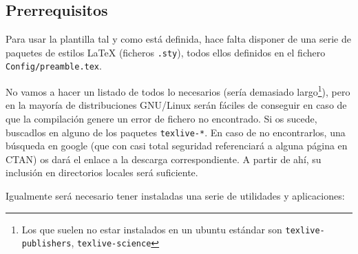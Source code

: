 \documentclass[spanish,openright]{book}
\begin{document}
\subsection{Prerrequisitos}
\label{sec:prerrequisitos}

Para usar la plantilla tal y como está definida, hace falta disponer de
una serie de paquetes de estilos \LaTeX{} (ficheros \texttt{.sty}),
todos ellos definidos en el fichero \texttt{Config/preamble.tex}.

No vamos a hacer un listado de todos lo necesarios (sería demasiado
largo\footnote{Los que suelen no estar instalados en un ubuntu estándar
son \texttt{texlive-publishers}, \texttt{texlive-science}}), pero en
la mayoría de distribuciones GNU/Linux serán fáciles de conseguir en
caso de que la compilación genere un error de fichero no encontrado. Si
os sucede, buscadlos en alguno de los paquetes \texttt{texlive-*}. En
caso de no encontrarlos, una búsqueda en google (que con casi total
seguridad referenciará a alguna página en CTAN) os dará el enlace a la
descarga correspondiente. A partir de ahí, su inclusión en directorios
locales será suficiente.


Igualmente será necesario tener instaladas una serie de utilidades y
aplicaciones:
\end{document}
